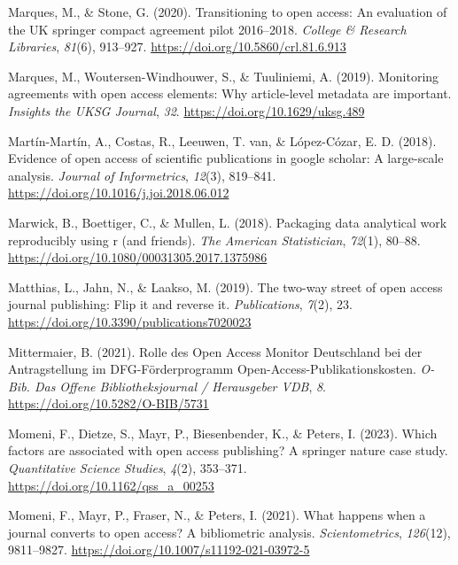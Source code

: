 \documentclass[a4paper,man,floatsintext,longtable,noextraspace,12pt]{apa6}
\newenvironment{CSLReferences}%
  {}%
  {\par}
\begin{document}
\begin{CSLReferences}{1}{0}
\leavevmode{}%
Marques, M., \& Stone, G. (2020). Transitioning to open access: An
evaluation of the {UK} springer compact agreement pilot 2016--2018.
\emph{College {\&} Research Libraries}, \emph{81}(6), 913--927.
\url{https://doi.org/10.5860/crl.81.6.913}

\leavevmode{}%
Marques, M., Woutersen-Windhouwer, S., \& Tuuliniemi, A. (2019).
Monitoring agreements with open access elements: Why article-level
metadata are important. \emph{Insights the {UKSG} Journal}, \emph{32}.
\url{https://doi.org/10.1629/uksg.489}

\leavevmode{}%
Martín-Martín, A., Costas, R., Leeuwen, T. van, \& López-Cózar, E. D.
(2018). Evidence of open access of scientific publications in google
scholar: A large-scale analysis. \emph{Journal of Informetrics},
\emph{12}(3), 819--841. \url{https://doi.org/10.1016/j.joi.2018.06.012}

\leavevmode{}%
Marwick, B., Boettiger, C., \& Mullen, L. (2018). Packaging data
analytical work reproducibly using r (and friends). \emph{The American
Statistician}, \emph{72}(1), 80--88.
\url{https://doi.org/10.1080/00031305.2017.1375986}

\leavevmode{}%
Matthias, L., Jahn, N., \& Laakso, M. (2019). The two-way street of open
access journal publishing: Flip it and reverse it. \emph{Publications},
\emph{7}(2), 23. \url{https://doi.org/10.3390/publications7020023}

\leavevmode{}%
Mittermaier, B. (2021). {Rolle des Open Access Monitor Deutschland bei
der Antragstellung im DFG-Förderprogramm
Open-Access-Publikationskosten}. \emph{{O-Bib. Das Offene
Bibliotheksjournal / Herausgeber VDB}}, \emph{8}.
\url{https://doi.org/10.5282/O-BIB/5731}

\leavevmode{}%
Momeni, F., Dietze, S., Mayr, P., Biesenbender, K., \& Peters, I.
(2023). Which factors are associated with open access publishing? A
springer nature case study. \emph{Quantitative Science Studies},
\emph{4}(2), 353--371. \url{https://doi.org/10.1162/qss_a_00253}

\leavevmode{}%
Momeni, F., Mayr, P., Fraser, N., \& Peters, I. (2021). What happens
when a journal converts to open access? A bibliometric analysis.
\emph{Scientometrics}, \emph{126}(12), 9811--9827.
\url{https://doi.org/10.1007/s11192-021-03972-5}


\end{CSLReferences}
\end{document}
